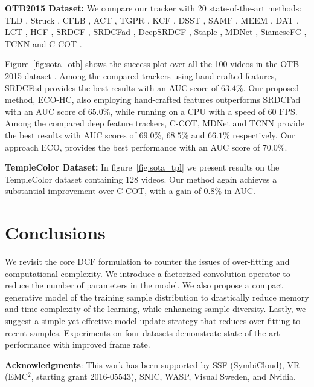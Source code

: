 \documentclass[10pt,twocolumn,letterpaper]{article}
\newcommand{\parsection}[1]{\noindent\textbf{#1:}}
\begin{document}
\parsection{OTB2015 Dataset}
We compare our tracker with 20 state-of-the-art methods: TLD \cite{Mikolajczyk10d}, Struck \cite{Torr11b}, CFLB \cite{GaloogahiCVPR2015}, ACT \cite{DanelljanCVPR14}, TGPR \cite{TGPR2014}, KCF \cite{Henriques14}, DSST \cite{DanelljanBMVC14}, SAMF \cite{Li2014}, MEEM \cite{MEEM2014}, DAT \cite{possegger15a}, LCT \cite{LTC_CVPR15}, HCF \cite{HCF_ICCV15}, SRDCF \cite{DanelljanICCV2015}, SRDCFad \cite{DanelljanCVPR2016a}, DeepSRDCF \cite{DanelljanVOT2015}, Staple \cite{Staple}, MDNet \cite{MDNet}, SiameseFC \cite{SiameseFC}, TCNN \cite{TCNN} and C-COT \cite{DanelljanECCV2016}.

Figure~\ref{fig:sota_otb} shows the success plot over all the 100 videos in the OTB-2015
dataset \cite{OTB2015}. Among the compared trackers using hand-crafted features, SRDCFad provides the best results with an AUC score of $63.4\%$. Our proposed method, ECO-HC, also employing hand-crafted features outperforms SRDCFad with an AUC score of $65.0\%$, while running on a CPU with a speed of 60 FPS. Among the compared deep feature trackers, C-COT, MDNet and TCNN provide the best results with AUC scores of $69.0\%$, $68.5\%$ and $66.1\%$ respectively. Our approach ECO, provides the best performance with an AUC score of $70.0\%$.

\parsection{TempleColor Dataset}
In figure~\ref{fig:sota_tpl} we present results on the TempleColor dataset \cite{TempleColor} containing 128 videos. Our method again achieves a substantial improvement over C-COT, with a gain of $0.8 \%$ in AUC.
 
\section{Conclusions} 
We revisit the core DCF formulation to counter the issues of over-fitting and computational complexity. 
We introduce a factorized convolution operator to reduce the number of parameters in the model. We also propose a compact generative model of the training sample distribution to drastically reduce memory and time complexity of the learning, while enhancing sample diversity. Lastly, we suggest a simple yet effective model update strategy that reduces over-fitting to recent samples. Experiments on four datasets demonstrate state-of-the-art performance with improved frame rate. 

\noindent\textbf{Acknowledgments}:
This work has been supported by SSF (SymbiCloud), VR (EMC${}^2$, starting grant 2016-05543), SNIC, WASP, Visual Sweden, and Nvidia. 
\end{document}
